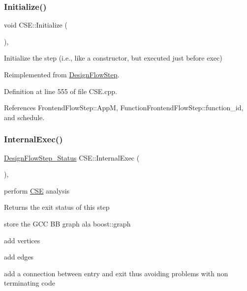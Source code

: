 \subsubsection{\texorpdfstring{Initialize()}{Initialize()}}
{\footnotesize\ttfamily void C\+S\+E\+::\+Initialize (\begin{DoxyParamCaption}{ }\end{DoxyParamCaption})\hspace{0.3cm}{\ttfamily [override]}, {\ttfamily [virtual]}}



Initialize the step (i.\+e., like a constructor, but executed just before exec) 



Reimplemented from \hyperlink{classDesignFlowStep_a44b50683382a094976e1d432a7784799}{Design\+Flow\+Step}.



Definition at line 555 of file C\+S\+E.\+cpp.



References Frontend\+Flow\+Step\+::\+AppM, Function\+Frontend\+Flow\+Step\+::function\+\_\+id, and schedule.

\mbox{\label{classCSE_adbf292294aa82603ea2189ddf1293508}} 
\subsubsection{\texorpdfstring{Internal\+Exec()}{InternalExec()}}
{\footnotesize\ttfamily \hyperlink{design__flow__step_8hpp_afb1f0d73069c26076b8d31dbc8ebecdf}{Design\+Flow\+Step\+\_\+\+Status} C\+S\+E\+::\+Internal\+Exec (\begin{DoxyParamCaption}{ }\end{DoxyParamCaption})\hspace{0.3cm}{\ttfamily [override]}, {\ttfamily [virtual]}}



perform \hyperlink{classCSE}{C\+SE} analysis 

\begin{DoxyReturn}{Returns}
the exit status of this step 
\end{DoxyReturn}
store the G\+CC BB graph ala boost\+::graph

add vertices

add edges

add a connection between entry and exit thus avoiding problems with non terminating code

